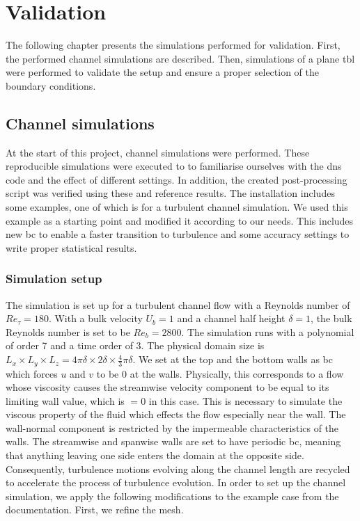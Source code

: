 \chapter{Validation} \label{chap:validation}


The following chapter presents the simulations performed for validation.
First, the performed channel simulations are described.
Then, simulations of a plane \acrshort{tbl} were performed to validate the setup and ensure a proper selection of the boundary conditions.

\section{Channel simulations}\label{sec:channel}
At the start of this project, channel simulations were performed. 
These reproducible simulations were executed to to familiarise ourselves with the \acrshort{dns} code and the effect of different settings. 
In addition, the created post-processing script was verified using these and reference results.
The  installation includes some examples, one of which is for a turbulent channel simulation.
We used this example as a starting point and modified it according to our needs.
This includes new \acrshort{bc} to enable a faster transition to turbulence and some accuracy settings to write proper statistical results.

\subsection{Simulation setup} \label{subsec:channelSetup}

The simulation is set up for a turbulent channel flow with a Reynolds number of $Re_\tau = 180$.
With a bulk velocity $U_b = 1$ and a channel half height $\delta = 1$, the bulk Reynolds number is set to be $Re_b = 2800$.
The simulation runs with a polynomial of order 7 and a time order of 3.
The physical domain size is $ L_x \times L_y \times L_z = 4\pi \delta \times 2 \delta \times \frac{4}{3}\pi \delta$.
We set 
at the top and the bottom walls as \acrshort{bc} which forces $u$ and $v$ to be 0 at the walls.
Physically, this corresponds to a flow whose viscosity causes the streamwise velocity component to be equal to its limiting wall value, which is $=0$ in this case.
This is necessary to simulate the viscous property of the fluid which effects the flow especially near the wall.
The wall-normal component is restricted by the impermeable characteristics of the walls.
The streamwise and spanwise walls are set to have periodic \acrlong{bc}, meaning that anything leaving one side enters the domain at the opposite side.
Consequently, turbulence motions evolving along the channel length are recycled to accelerate the process of turbulence evolution.
In order to set up the channel simulation, we apply the following modifications to the example case from the  documentation.
First, we refine the mesh.


